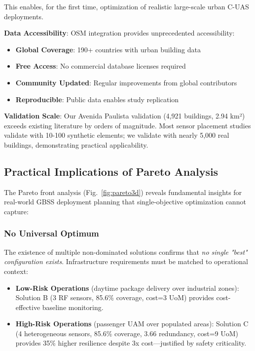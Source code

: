 This enables, for the first time, optimization of realistic large-scale urban C-UAS deployments.

\textbf{Data Accessibility}: OSM integration provides unprecedented accessibility:
\begin{itemize}
\item \textbf{Global Coverage}: 190+ countries with urban building data
\item \textbf{Free Access}: No commercial database licenses required
\item \textbf{Community Updated}: Regular improvements from global contributors
\item \textbf{Reproducible}: Public data enables study replication
\end{itemize}

\textbf{Validation Scale}: Our Avenida Paulista validation (4,921 buildings, 2.94 km²) exceeds existing literature by orders of magnitude. Most sensor placement studies validate with 10-100 synthetic elements; we validate with nearly 5,000 real buildings, demonstrating practical applicability.

\subsection{Practical Implications of Pareto Analysis}

The Pareto front analysis (Fig.~\ref{fig:pareto3d}) reveals fundamental insights for real-world GBSS deployment planning that single-objective optimization cannot capture:

\subsubsection{No Universal Optimum}

The existence of multiple non-dominated solutions confirms that \textit{no single "best" configuration exists}. Infrastructure requirements must be matched to operational context:

\begin{itemize}
\item \textbf{Low-Risk Operations} (daytime package delivery over industrial zones): Solution B (3 RF sensors, 85.6\% coverage, cost=3 UoM) provides cost-effective baseline monitoring.

\item \textbf{High-Risk Operations} (passenger UAM over populated areas): Solution C (4 heterogeneous sensors, 85.6\% coverage, 3.66 redundancy, cost=9 UoM) provides 35\% higher resilience despite 3x cost—justified by safety criticality.
\end{itemize}

